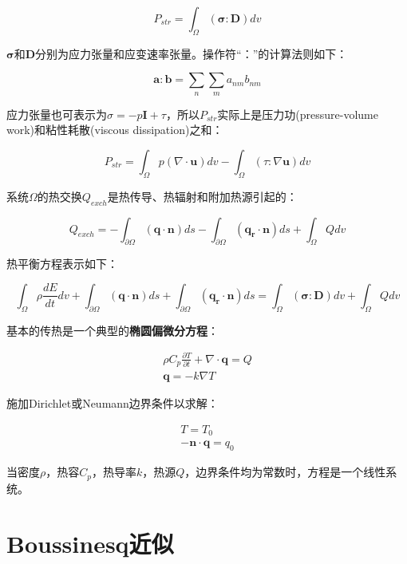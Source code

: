 \begin{equation}
    P_{str} = \int_{\Omega} (\bm{\sigma:D}) dv
\end{equation}

$\bm{\sigma}$和$\bm{D}$分别为应力张量和应变速率张量。操作符“：”的计算法则如下：

\begin{equation}
    \bm{a:b} = \sum_n \sum_m a_{nm}b_{nm}
\end{equation}

应力张量也可表示为$\sigma = -p\bm{I}+\tau$，所以$P_{str}$实际上是压力功(pressure-volume work)和粘性耗散(viscous
dissipation)之和：

\begin{equation}
    P_{str} = \int_{\Omega} p(\nabla\cdot \bm{u}) dv - \int_{\Omega}(\tau:\nabla \bm{u}) dv
\end{equation}

系统$\Omega$的热交换$Q_{exch}$是热传导、热辐射和附加热源引起的：

\begin{equation}
    Q_{exch} = - \int_{\partial\Omega} (\bm{q\cdot n}) ds - \int_{\partial\Omega} (\bm{q_r\cdot n}) ds + \int_{\Omega}Q dv
\end{equation}

热平衡方程表示如下：

\begin{equation}
    \int_{\Omega} \rho \frac{dE}{dt} dv + \int_{\partial\Omega} (\bm{q\cdot n}) ds + \int_{\partial\Omega} (\bm{q_r\cdot n}) ds = \int_{\Omega} (\bm{\sigma:D}) dv + \int_{\Omega} Q dv
\end{equation}

基本的传热是一个典型的\textbf{椭圆偏微分方程}：

\begin{gather}
    \rho C_p \frac{\partial T}{\partial t} + \nabla\cdot \bm{q} = Q \\
    \bm{q} = -k \nabla T
\end{gather}

施加Dirichlet或Neumann边界条件以求解：

\begin{gather}
    T = T_0\\
    -\bm{n\cdot q} = q_0
\end{gather}

当密度$\rho$，热容$C_p$，热导率$k$，热源$Q$，边界条件均为常数时，方程是一个线性系统。

\section{Boussinesq近似}

